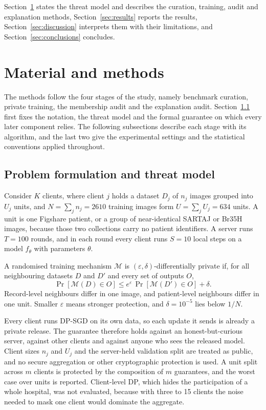 \documentclass[preprint,12pt]{elsarticle}
\begin{document}
Section~\ref{sec:methods} states the threat model and describes the curation, training, audit and explanation
methods, Section~\ref{sec:results} reports the results, Section~\ref{sec:discussion} interprets them with their
limitations, and Section~\ref{sec:conclusions} concludes.

\section{Material and methods}\label{sec:methods}
The methods follow the four stages of the study, namely benchmark curation, private training, the membership audit and
the explanation audit. Section~\ref{sec:threat} first fixes the notation, the threat model and the formal guarantee on
which every later component relies. The following subsections describe each stage with its algorithm, and the last two
give the experimental settings and the statistical conventions applied throughout.

\subsection{Problem formulation and threat model}\label{sec:threat}
Consider $K$ clients, where client $j$ holds a dataset $D_j$ of $n_j$ images grouped into $U_j$ units, and
$N=\sum_j n_j=2610$ training images form $U=\sum_j U_j=634$ units. A unit is one Figshare patient, or a group of
near-identical SARTAJ or Br35H images, because those two collections carry no patient identifiers. A server runs
$T=100$ rounds, and in each round every client runs $S=10$ local steps on a model $f_\theta$ with parameters
$\theta$.

A randomised training mechanism $\mathcal{M}$ is $(\varepsilon,\delta)$-differentially private if, for all
neighbouring datasets $D$ and $D'$ and every set of outputs $O$,
\begin{equation}
\Pr[\mathcal{M}(D)\in O] \le e^{\varepsilon}\,\Pr[\mathcal{M}(D')\in O] + \delta .
\label{eq:dp}
\end{equation}
Record-level neighbours differ in one image, and patient-level neighbours differ in one unit. Smaller $\varepsilon$
means stronger protection, and $\delta=10^{-5}$ lies below $1/N$.

Every client runs DP-SGD on its own data, so each update it sends is already a private release. The guarantee
therefore holds against an honest-but-curious server, against other clients and against anyone who sees the released
model. Client sizes $n_j$ and $U_j$ and the server-held validation split are treated as public, and no secure
aggregation or other cryptographic protection\cite{li2026} is used. A unit split across $m$ clients is protected by the composition of $m$ guarantees, and the worst
case over units is reported. Client-level DP, which hides the participation of a whole hospital,\cite{mcmahan2018} was
not evaluated, because with three to 15 clients the noise needed to mask one client would dominate the aggregate.
\end{document}
